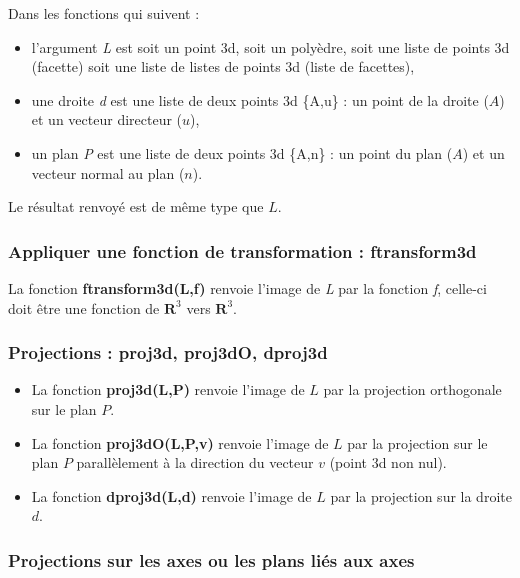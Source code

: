 Dans les fonctions qui suivent :
\begin{itemize}
    \item l'argument \emph{L} est soit un point 3d, soit un polyèdre, soit une liste de points 3d (facette) soit une liste de listes de points 3d (liste de facettes),
    \item une droite \emph{d} est une liste de deux points 3d \{A,u\} : un point de la droite ($A$) et un vecteur directeur ($u$),
    \item un plan \emph{P} est une liste de deux points 3d \{A,n\} : un point du plan ($A$) et un vecteur normal au plan ($n$).
  \end{itemize}
Le résultat renvoyé est de même type que $L$.
  
\subsubsection{Appliquer une fonction de transformation : ftransform3d}

La fonction \textbf{ftransform3d(L,f)} renvoie l'image de \emph{L} par la fonction \emph{f}, celle-ci  doit être une fonction de $\mathbf R^3$ vers $\mathbf R^3$.

\subsubsection{Projections : proj3d, proj3dO, dproj3d}

\begin{itemize}
    \item La fonction \textbf{proj3d(L,P)} renvoie l'image de $L$ par la projection orthogonale sur le plan $P$.
    \item La fonction \textbf{proj3dO(L,P,v)} renvoie l'image de $L$ par la projection sur le plan $P$ parallèlement à la direction du vecteur $v$ (point 3d non nul).
    \item La fonction \textbf{dproj3d(L,d)} renvoie l'image de $L$ par la projection sur la droite $d$.
\end{itemize}

\subsubsection{Projections sur les axes ou les plans liés aux axes}

